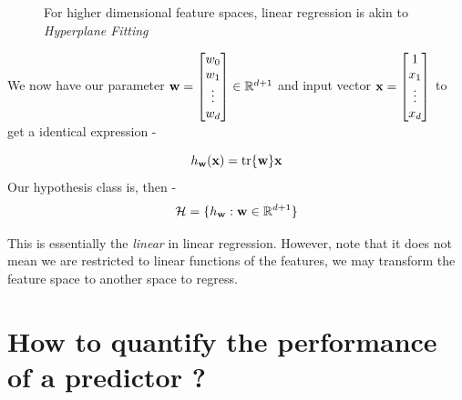 \begin{figure} [h]
  \centering
  \caption{For higher dimensional feature spaces, linear regression is akin to \emph{Hyperplane Fitting}}
\end{figure}

We now have our parameter \(\mathbf{w} = \begin{bmatrix}w_0\\w_1\\\vdots\\w_d\end{bmatrix} \in \mathbb{R}^{d+1}\) and input vector \(\mathbf{x} = \begin{bmatrix}1\\x_1\\\vdots\\x_d\end{bmatrix}\) to get a identical expression -

$$
  h_{\mathbf{w}}(\mathbf{x}) = \tr{\mathbf{w}} \mathbf{x}
$$
Our hypothesis class is, then -
$$
  \mathcal{H} = \{ h_{\mathbf{w}} : \mathbf{w} \in \mathbb{R}^{d+1} \}
$$

This is essentially the \textit{linear} in linear regression. However, note that it does not mean we are restricted to linear functions of the features, we may transform the feature space to another space to regress.

\section{How to quantify the performance of a predictor ?}

